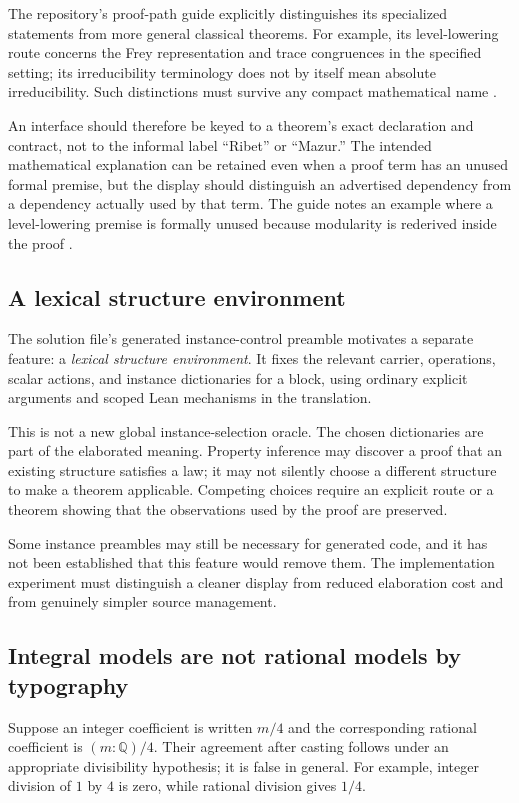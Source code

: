 \documentclass[11pt,a4paper]{article}
\newcommand{\Q}{\mathbb Q}
\theoremstyle{definition}
\begin{document}
The repository's proof-path guide explicitly distinguishes its specialized
statements from more general classical theorems. For example, its level-lowering
route concerns the Frey representation and trace congruences in the specified
setting; its irreducibility terminology does not by itself mean absolute
irreducibility. Such distinctions must survive any compact mathematical name
\cite{fltpath}.

An interface should therefore be keyed to a theorem's exact declaration and
contract, not to the informal label ``Ribet'' or ``Mazur.'' The intended
mathematical explanation can be retained even when a proof term has an unused
formal premise, but the display should distinguish an advertised dependency
from a dependency actually used by that term. The guide notes an example where
a level-lowering premise is formally unused because modularity is rederived
inside the proof \cite{fltpath}.

\subsection{A lexical structure environment}
The solution file's generated instance-control preamble motivates a separate
feature: a \emph{lexical structure environment}. It fixes the relevant carrier,
operations, scalar actions, and instance dictionaries for a block, using
ordinary explicit arguments and scoped Lean mechanisms in the translation.

This is not a new global instance-selection oracle. The chosen dictionaries
are part of the elaborated meaning. Property inference may discover a proof
that an existing structure satisfies a law; it may not silently choose a
different structure to make a theorem applicable. Competing choices require an
explicit route or a theorem showing that the observations used by the proof
are preserved.

Some instance preambles may still be necessary for generated code, and it has
not been established that this feature would remove them. The implementation
experiment must distinguish a cleaner display from reduced elaboration cost
and from genuinely simpler source management.

\subsection{Integral models are not rational models by typography}
Suppose an integer coefficient is written $m/4$ and the corresponding rational
coefficient is $(m:\Q)/4$. Their agreement after casting follows under an
appropriate divisibility hypothesis; it is false in general. For example,
integer division of $1$ by $4$ is zero, while rational division gives $1/4$.
\end{document}
